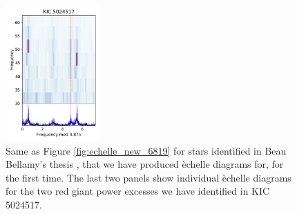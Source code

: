 \begin{figure}
    \includegraphics[width=0.32\textwidth]{Chapter5/5024517_b_echelle.png}
    
    \caption[\'Echelle diagrams for the identified cluster red giants in NGC\,6819 (II)]{Same as Figure \ref{fig:echelle_new_6819} for stars identified in Beau Bellamy's thesis \citep{bellamy_using_2015}, that we have produced \`echelle diagrams for, for the first time. The last two panels show individual \`echelle diagrams for the two red giant power excesses we have identified in KIC\,5024517.}
    \label{fig:echelle_new2_6819}
\end{figure}